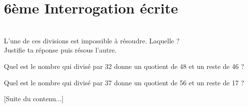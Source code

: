 \documentclass[10pt,openany]{book}
\begin{document}
\pagestyle{empty}
\section*{6\`eme Interrogation \'ecrite}

\\
L'une de ces divisions est impossible \`a r\'esoudre. Laquelle ?\\ Justifie ta r\'eponse puis r\'esous l'autre.
\begin{multicols}{2}
Quel est le nombre qui divis\'e par 32 donne un quotient de 48 et un reste de 46 ?

\columnbreak
Quel est le nombre qui divis\'e par 37 donne un quotient de 56 et un reste de 17 ?
\end{multicols}

[Suite du contenu...]
\end{document}
